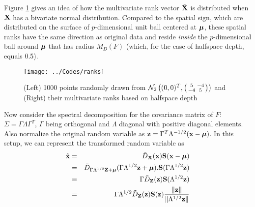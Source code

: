 \documentclass[fleqn,11pt]{article}
\begin{document}
Figure \ref{fig:rankplot} gives an idea of how the multivariate rank vector $\tilde {{\mathbf{X}}}$ is distributed when ${\mathbf{X}}$ has a bivariate normal distribution. Compared to the spatial sign, which are distributed on the surface of $p$-dimensional unit ball centered at ${\boldsymbol{\mu}}$, these spatial ranks have the same direction as original data and reside \textit{inside} the $p$-dimensional ball around ${\boldsymbol{\mu}}$ that has radius $M_D(F)$ (which, for the case of halfspace depth, equals 0.5).

\begin{figure}[t]
	\captionsetup{singlelinecheck=off}
	\centering
		\texttt{[image: ../Codes/ranks]}
	\caption{(Left) 1000 points randomly drawn from $\mathcal N_2\left((0,0)^T, \left(\protect\begin{smallmatrix} 5 & -4 \\ -4 & 5 \protect\end{smallmatrix}\right)\right) $ and (Right) their multivariate ranks based on halfspace depth}
	\label{fig:rankplot}
\end{figure}

Now consider the spectral decomposition for the covariance matrix of $F$: $\Sigma = \Gamma\Lambda\Gamma^T$, $\Gamma$ being orthogonal and $\Lambda$ diagonal with positive diagonal elements. Also normalize the original random variable as ${\bf{z}} = \Gamma^T\Lambda^{-1/2} ({\bf{x}} - {\boldsymbol{\mu}})$. In this setup, we can represent the transformed random variable as
%
\begin{eqnarray}
\tilde {{\bf{x}}} &=& \tilde D_{{\mathbf{X}}} ({\bf{x}}) {\mathbf{S}}({\bf{x}} - {\boldsymbol{\mu}}) \notag \\
&=& \tilde D_{\Gamma\Lambda^{1/2}{\mathbf{Z}} + {\boldsymbol{\mu}}} (\Gamma\Lambda^{1/2} {\bf{z}} + {\boldsymbol{\mu}}). {\mathbf{S}}(\Gamma\Lambda^{1/2} {\bf{z}}) \notag \\
&=& \Gamma \tilde D_{{\mathbf{Z}}}({\bf{z}}) {\mathbf{S}}(\Lambda^{1/2}{\bf{z}}) \notag \\
&=& \Gamma \Lambda^{1/2} \tilde D_{{\mathbf{Z}}}({\bf{z}}) {\mathbf{S}}({\bf{z}}) \frac{\| {\bf{z}} \|}{\|\Lambda^{1/2} {\bf{z}}\|}
\label{equation:rankdecomp}
\end{eqnarray}
%
\end{document}
